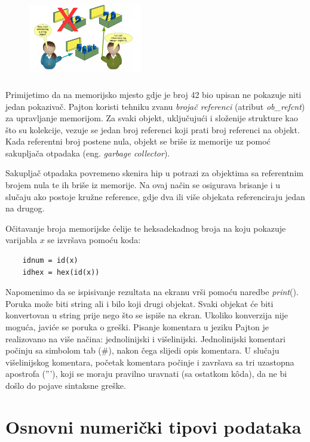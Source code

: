 \begin{figure}[H]
	\centering
	\includegraphics[width=140pt,height=100pt]{slike/varX_different_assigned.png}
\end{figure}

Primijetimo da na memorijsko mjesto gdje je broj 42 bio upisan ne pokazuje niti jedan pokazivač.  Pajton koristi tehniku zvanu \textit{brojač referenci} (atribut \textit{ob\_refcnt}) za upravljanje memorijom. Za svaki objekt, uključujući i složenije strukture kao što su kolekcije, vezuje se jedan broj referenci koji prati broj referenci na objekt. Kada referentni broj postene nula, objekt se briše iz memorije uz pomoć sakupljača otpadaka (eng. \textit{garbage collector}).

Sakupljač otpadaka   povremeno skenira hip u potrazi za objektima sa referentnim brojem nula te ih briše   iz memorije. Na ovaj način se osigurava brisanje i u slučaju  ako postoje kružne reference, gdje dva ili više objekata referenciraju jedan na drugog.

Očitavanje broja memorijske ćelije te heksadekadnog broja na koju pokazuje varijabla $x$ se izvršava pomoću koda:
\begin{verbatim}
	idnum = id(x) 
	idhex = hex(id(x)) 
\end{verbatim} 
 Napomenimo da se ispisivanje rezultata na ekranu vrši pomoću naredbe \emph{print}(). Poruka može biti string ali i bilo koji drugi objekat. Svaki objekat će biti konvertovan u string prije nego što se ispiše na ekran. Ukoliko konverzija nije moguća, javiće se poruka o greški. Pisanje komentara u jeziku Pajton je realizovano na više načina: jednolinijski i višelinijski. Jednolinijski komentari počinju sa simbolom tab (\#), nakon čega slijedi opis komentara. U slučaju višelinijskog komentara, početak komentara počinje i završava sa tri uzastopna apostrofa ('''), koji se moraju pravilno uravnati (sa ostatkom k\^oda), da ne bi došlo do pojave sintaksne greške.  
 


\section{Osnovni numerički tipovi podataka}

